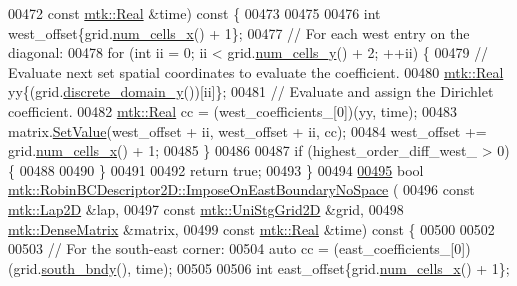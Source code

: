 \begin{DoxyCode}
00472     \textcolor{keyword}{const} \hyperlink{group__c01-roots_gac080bbbf5cbb5502c9f00405f894857d}{mtk::Real} &time)\textcolor{keyword}{ const }\{
00473 
00475 
00476   \textcolor{keywordtype}{int} west\_offset\{grid.\hyperlink{classmtk_1_1UniStgGrid2D_a2d182866a398aba8e4829590e85bf939}{num\_cells\_x}() + 1\};
00477   \textcolor{comment}{// For each west entry on the diagonal:}
00478   \textcolor{keywordflow}{for} (\textcolor{keywordtype}{int} ii = 0; ii < grid.\hyperlink{classmtk_1_1UniStgGrid2D_aed05a801cc9a76dba0ff203cea58a61a}{num\_cells\_y}() + 2; ++ii) \{
00479     \textcolor{comment}{// Evaluate next set spatial coordinates to evaluate the coefficient.}
00480     \hyperlink{group__c01-roots_gac080bbbf5cbb5502c9f00405f894857d}{mtk::Real} yy\{(grid.\hyperlink{classmtk_1_1UniStgGrid2D_ac33a58d65105550dcf6f6b92b48b5105}{discrete\_domain\_y}())[ii]\};
00481     \textcolor{comment}{// Evaluate and assign the Dirichlet coefficient.}
00482     \hyperlink{group__c01-roots_gac080bbbf5cbb5502c9f00405f894857d}{mtk::Real} cc = (west\_coefficients\_[0])(yy, time);
00483     matrix.\hyperlink{classmtk_1_1DenseMatrix_a784ce5784109ac86bfb9d8562b334b13}{SetValue}(west\_offset + ii, west\_offset + ii, cc);
00484     west\_offset += grid.\hyperlink{classmtk_1_1UniStgGrid2D_a2d182866a398aba8e4829590e85bf939}{num\_cells\_x}() + 1;
00485   \}
00486 
00487   \textcolor{keywordflow}{if} (highest\_order\_diff\_west\_ > 0) \{
00488 
00490   \}
00491 
00492   \textcolor{keywordflow}{return} \textcolor{keyword}{true};
00493 \}
00494 
\hypertarget{mtk__robin__bc__descriptor__2d_8cc_source_l00495}{}\hyperlink{classmtk_1_1RobinBCDescriptor2D_ae1df82802d541d3566f3d2659e4aaf05}{00495} \textcolor{keywordtype}{bool} \hyperlink{classmtk_1_1RobinBCDescriptor2D_ae1df82802d541d3566f3d2659e4aaf05}{mtk::RobinBCDescriptor2D::ImposeOnEastBoundaryNoSpace}
      (
00496     \textcolor{keyword}{const} \hyperlink{classmtk_1_1Lap2D}{mtk::Lap2D} &lap,
00497     \textcolor{keyword}{const} \hyperlink{classmtk_1_1UniStgGrid2D}{mtk::UniStgGrid2D} &grid,
00498     \hyperlink{classmtk_1_1DenseMatrix}{mtk::DenseMatrix} &matrix,
00499     \textcolor{keyword}{const} \hyperlink{group__c01-roots_gac080bbbf5cbb5502c9f00405f894857d}{mtk::Real} &time)\textcolor{keyword}{ const }\{
00500 
00502 
00503   \textcolor{comment}{// For the south-east corner:}
00504   \textcolor{keyword}{auto} cc = (east\_coefficients\_[0])(grid.\hyperlink{classmtk_1_1UniStgGrid2D_a1442eaf219f099d0ebf46a170fdebf92}{south\_bndy}(), time);
00505 
00506   \textcolor{keywordtype}{int} east\_offset\{grid.\hyperlink{classmtk_1_1UniStgGrid2D_a2d182866a398aba8e4829590e85bf939}{num\_cells\_x}() + 1\};

\end{DoxyCode}
